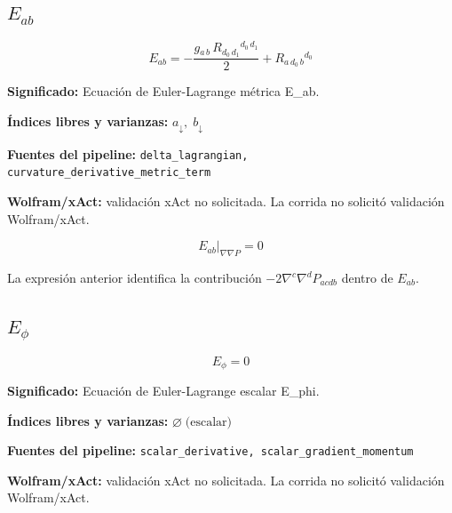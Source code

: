 \documentclass[11pt]{article}
\begin{document}
\subsection*{$ E_{ab} $}
\begin{dmath*}[breakdepth={5}]
E_{ab} = -\frac{g{}_{a\,b}\,R{}_{d_{0}\,d_{1}}{}^{d_{0}\,d_{1}}}{2} + R{}_{a\,d_{0}\,b}{}^{d_{0}}
\end{dmath*}
\par\vspace{1.2\baselineskip}\noindent
\begin{minipage}{\linewidth}
\textbf{Significado:} Ecuación de Euler-Lagrange métrica E\_ab.\par
\textbf{Índices libres y varianzas:} $ a_{\downarrow},\;b_{\downarrow} $\par
\textbf{Fuentes del pipeline:} \texttt{delta\_lagrangian, curvature\_derivative\_metric\_term}\par
\textbf{Wolfram/xAct:} validación xAct no solicitada. La corrida no solicitó validación Wolfram/xAct.\par
\end{minipage}
\begin{dmath*}[breakdepth={5}]
\left.E_{ab}\right|_{\nabla\nabla P} = 0
\end{dmath*}
\par\vspace{0.8\baselineskip}\noindent
\begin{minipage}{\linewidth}
La expresión anterior identifica la contribución $-2\nabla^c\nabla^dP_{acdb}$ dentro de $E_{ab}$.\par
\end{minipage}
\subsection*{$ E_{\phi} $}
\begin{dmath*}[breakdepth={5}]
E_{\phi} = 0
\end{dmath*}
\par\vspace{1.2\baselineskip}\noindent
\begin{minipage}{\linewidth}
\textbf{Significado:} Ecuación de Euler-Lagrange escalar E\_phi.\par
\textbf{Índices libres y varianzas:} $ \varnothing\;\text{(escalar)} $\par
\textbf{Fuentes del pipeline:} \texttt{scalar\_derivative, scalar\_gradient\_momentum}\par
\textbf{Wolfram/xAct:} validación xAct no solicitada. La corrida no solicitó validación Wolfram/xAct.\par
\end{minipage}
\end{document}
